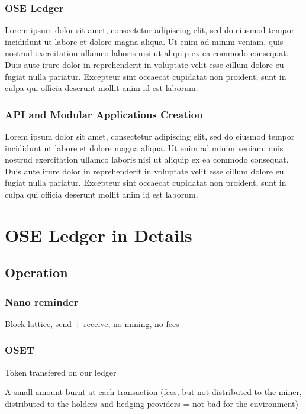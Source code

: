 \documentclass[a4paper]{article}
\begin{document}
\subsubsection{OSE Ledger}

Lorem ipsum dolor sit amet, consectetur adipiscing elit, sed do eiusmod tempor incididunt ut labore et dolore magna aliqua. Ut enim ad minim veniam, quis nostrud exercitation ullamco laboris nisi ut aliquip ex ea commodo consequat. Duis aute irure dolor in reprehenderit in voluptate velit esse cillum dolore eu fugiat nulla pariatur. Excepteur sint occaecat cupidatat non proident, sunt in culpa qui officia deserunt mollit anim id est laborum.

\subsubsection{API and Modular Applications Creation}

Lorem ipsum dolor sit amet, consectetur adipiscing elit, sed do eiusmod tempor incididunt ut labore et dolore magna aliqua. Ut enim ad minim veniam, quis nostrud exercitation ullamco laboris nisi ut aliquip ex ea commodo consequat. Duis aute irure dolor in reprehenderit in voluptate velit esse cillum dolore eu fugiat nulla pariatur. Excepteur sint occaecat cupidatat non proident, sunt in culpa qui officia deserunt mollit anim id est laborum.

\newpage

\section{OSE Ledger in Details}

\subsection{Operation}

\subsubsection{Nano reminder}

Block-lattice, send + receive, no mining, no fees

\subsubsection{OSET}

Token transfered on our ledger

A small amount burnt at each transaction (fees, but not distributed to the miner, distributed to the holders and hedging providers = not bad for the environment)
\end{document}
